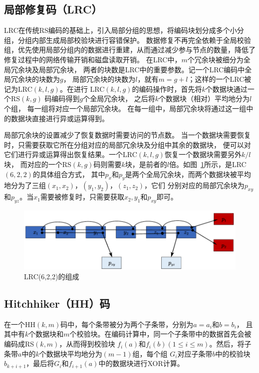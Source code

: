 \subsection{局部修复码（LRC）}

LRC在传统RS编码的基础上，引入局部分组的思想，将编码块划分成多个小分组，分组内部生成局部校验块进行容错保护。
数据修复不再完全依赖于全局校验组，优先使用局部分组内的数据进行重建，从而通过减少参与节点的数量，降低了修复过程中的网络传输开销和磁盘读取开销。
在LRC中，$m$个冗余块被细分为全局冗余块及局部冗余块，
两者的块数是LRC中的重要参数。记一个LRC编码中全局冗余块的块数为$g$，
局部冗余块的块数为$l$，就有$m = g + l$；这样的一个LRC被记为LRC$(k,l,g)$。在进行
LRC$(k,l,g)$的编码操作时，首先将$k$个数据块通过一个RS$(k,g)$
码编码得到$g$个全局冗余块，
之后将$k$个数据块（相对）平均地分为$l$个组，
每一组将对应一个局部冗余块。 
在每一组中，局部冗余块将通过这一组中的数据块直接进行异或运算得到。

局部冗余块的设置减少了恢复数据时需要访问的节点数。 
当一个数据块需要恢复时，只需要获取它所在分组对应的局部冗余块及分组中其余的数据块，
便可以对它们进行异或运算得出恢复结果。一个LRC$(k,l,g)$恢复一个数据块需要另外$k/l$块，
而对应的一个RS$(k,g)$码则需要$k$块，是前者的$l$倍。如图~\ref{fig:4.1}所示，是LRC$(6,2,2)$的具体组合方式，
其中$p_x$和$p_y$是两个全局冗余块，而两个数据块被平均地分为了三组$(x_1,x_2)$，$(y_1,y_2)$，$(z_1,z_2)$，它们
分别对应的局部冗余块为$p_{xy}$和$p_{yz}$。当$x_1$需要被修复时，只需要获取$x_2,y_1$和$p_{xy}$即可。


\begin{figure}[htbp]
	\centering
	\includegraphics [scale=0.7]{figures/4.1.pdf}
	\caption{LRC(6,2,2)的组成}
	\label{fig:4.1}
\end{figure}

\subsection{Hitchhiker（HH）码}

在一个HH$(k,m)$码中，每个条带被分为两个子条带，分别为$a={a_i}$和$b={b_i}$，
且其中有$k$个数据块和$m$个校验块。在编码计算中，同一个子条带中的数据首先会被编码成RS$(k,m)$，从而得到校验块
$f_i(a)$和$f_i(b)(1\leqslant i\leqslant m)$。然后，将子条带$a$中的$k$个数据块平均地分为$(m-1)$组，每个组
$G_i$对应子条带$b$中的校验块$b_{k+i+1}$，最后将$G_i$和$f_{i+1}(a)$中的数据块进行XOR计算。


